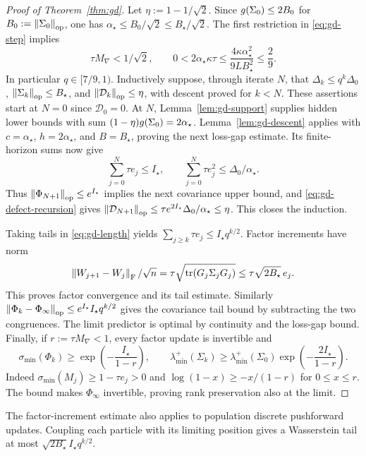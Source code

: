 \begin{proof}[Proof of Theorem~\ref{thm:gd}]
Let $\eta:=1-1/\sqrt2$. Since $g(\Sigma_0)\le2B_0$ for
$B_0:=\left\lVert \Sigma_0 \right\rVert_{\mathrm{op}}$, one has
$\alpha_\star\le B_0/\sqrt2\le B_\star/\sqrt2$.
The first restriction in \eqref{eq:gd-step} implies
\[
 \tau M_{\nabla}<1/\sqrt2,\qquad
 0<2\alpha_\star\kappa\tau
 \le\frac{4\kappa\alpha_\star^2}{9LB_\star^2}\le\frac29.
\]
In particular $q\in[7/9,1)$.
Inductively suppose, through iterate $N$, that
$\Delta_k\le q^k\Delta_0$,
$\left\lVert \Sigma_k \right\rVert_{\mathrm{op}}\le B_\star$, and
$\left\lVert \mathcal D_k \right\rVert_{\mathrm{op}}\le\eta$, with descent proved for $k<N$.
These assertions start at $N=0$ since $\mathcal D_0=0$.
At $N$, Lemma~\ref{lem:gd-support} supplies hidden lower bounds with sum
$(1-\eta)g(\Sigma_0)=2\alpha_\star$. Lemma~\ref{lem:gd-descent} applies with
$c=\alpha_\star$, $h=2\alpha_\star$, and $B=B_\star$, proving the next
loss-gap estimate. Its finite-horizon sums now give
\[
 \sum_{j=0}^{N}\tau e_j\le I_\star,\qquad
 \sum_{j=0}^{N}\tau e_j^2\le\Delta_0/\alpha_\star.
\]
Thus $\left\lVert \Phi_{N+1} \right\rVert_{\mathrm{op}}\le e^{I_\star}$ implies the next covariance
upper bound, and \eqref{eq:gd-defect-recursion} gives
$\left\lVert \mathcal D_{N+1} \right\rVert_{\mathrm{op}}
\le\tau e^{2I_\star}\Delta_0/\alpha_\star\le\eta$.
This closes the induction.

Taking tails in \eqref{eq:gd-length} yields
$\sum_{j\ge k}\tau e_j\le I_\star q^{k/2}$.
Factor increments have norm
\[
 \left\lVert W_{j+1}-W_j \right\rVert_{\mathrm{F}}/\sqrt n
=\tau\sqrt{\operatorname{tr}(G_j\Sigma_jG_j)}
\le\tau\sqrt{2B_\star}\,e_j.
\]
This proves factor convergence and its tail estimate. Similarly
$\left\lVert \Phi_k-\Phi_\infty \right\rVert_{\mathrm{op}}\le e^{I_\star}I_\star q^{k/2}$
gives the covariance tail bound by subtracting the two congruences.
The limit predictor is optimal by continuity and the loss-gap bound.
Finally, if $r:=\tau M_{\nabla}<1$, every factor update is invertible and
\[
 \sigma_{\min}(\Phi_k)\ge\exp\left(-\frac{I_\star}{1-r}\right),\qquad
 \lambda_{\min}^{+}(\Sigma_k)\ge\lambda_{\min}^{+}(\Sigma_0)
 \exp\left(-\frac{2I_\star}{1-r}\right).
\]
Indeed $\sigma_{\min}(M_j)\ge1-\tau e_j>0$ and
$\log(1-x)\ge-x/(1-r)$ for $0\le x\le r$. The bound makes
$\Phi_\infty$ invertible, proving rank preservation also at the limit.
\end{proof}
The factor-increment estimate also applies to population discrete
pushforward updates. Coupling each particle with its limiting position
gives a Wasserstein tail at most $\sqrt{2B_\star}I_\star q^{k/2}$.

